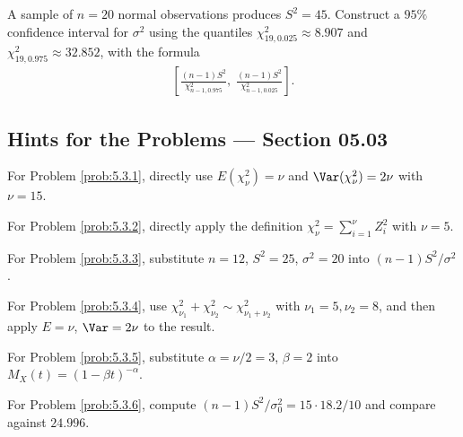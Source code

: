 \begin{problema}
	\label{prob:5.3.10}
	A sample of $n=20$ normal observations produces $S^2=45$. Construct a $95\%$ confidence interval for $\sigma^2$ using the quantiles $\chi^2_{19,0.025}\approx 8.907$ and $\chi^2_{19,0.975}\approx 32.852$, with the formula
	\begin{align*}
		\left[\frac{(n-1)S^2}{\chi^2_{n-1,0.975}},\; \frac{(n-1)S^2}{\chi^2_{n-1,0.025}}\right].
	\end{align*}
\end{problema}

\subsection*{Hints for the Problems --- Section 05.03}

\begin{sugerencia}
	\label{sug:5.3.1}
	For Problem \ref{prob:5.3.1}, directly use $E(\chi^2_\nu)=\nu$ and $\Var(\chi^2_\nu)=2\nu$ with $\nu=15$.
\end{sugerencia}

\begin{sugerencia}
	\label{sug:5.3.2}
	For Problem \ref{prob:5.3.2}, directly apply the definition $\chi^2_\nu=\sum_{i=1}^\nu Z_i^2$ with $\nu=5$.
\end{sugerencia}

\begin{sugerencia}
	\label{sug:5.3.3}
	For Problem \ref{prob:5.3.3}, substitute $n=12$, $S^2=25$, $\sigma^2=20$ into $(n-1)S^2/\sigma^2$.
\end{sugerencia}

\begin{sugerencia}
	\label{sug:5.3.4}
	For Problem \ref{prob:5.3.4}, use $\chi^2_{\nu_1}+\chi^2_{\nu_2}\sim\chi^2_{\nu_1+\nu_2}$ with $\nu_1=5,\nu_2=8$, and then apply $E=\nu$, $\Var=2\nu$ to the result.
\end{sugerencia}

\begin{sugerencia}
	\label{sug:5.3.5}
	For Problem \ref{prob:5.3.5}, substitute $\alpha=\nu/2=3$, $\beta=2$ into $M_X(t)=(1-\beta t)^{-\alpha}$.
\end{sugerencia}

\begin{sugerencia}
	\label{sug:5.3.6}
	For Problem \ref{prob:5.3.6}, compute $(n-1)S^2/\sigma_0^2 = 15\cdot 18.2/10$ and compare against $24.996$.
\end{sugerencia}

